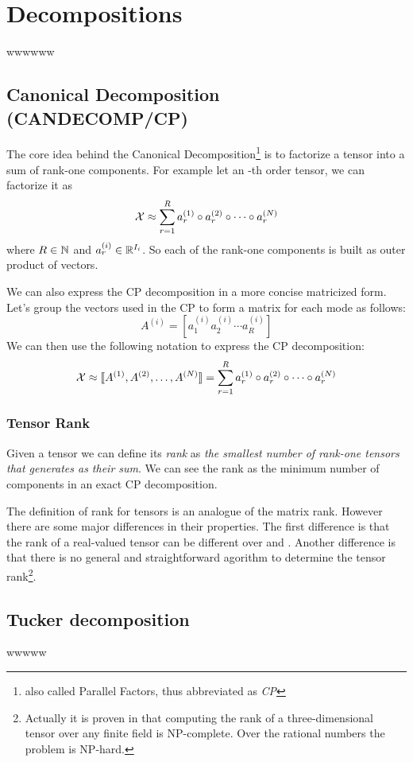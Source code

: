 \chapter{Decompositions}
wwwwww

\section{Canonical Decomposition (CANDECOMP/CP)}
The core idea behind the Canonical Decomposition\footnote{also called Parallel Factors, thus abbreviated as \emph{CP}} is to factorize a tensor into a sum of rank-one components. For example let \X an \N-th order tensor, we can factorize it as
\begin{equation}
  \mathcal{X} \approx \sum_{r = 1}^R a_r^{(1)} \circ a_r^{(2)} \circ \cdots \circ a_r^{(N)}
\end{equation}
where $R \in \mathbb{N}$ and $a_r^{(i)} \in \mathbb{R}^{I_i}$. So each of the rank-one components is built as outer product of \N vectors.

We can also express the CP decomposition in a more concise matricized form.
Let's group the vectors used in the CP to form a matrix for each mode  as follows:
\begin{equation*}
  A^{(i)} = [ a^{(i)}_1 a^{(i)}_2 \cdots a^{(i)}_R ]
\end{equation*}
We can then use the following notation to express the CP decomposition:
\begin{equation*}
  \mathcal{X} \approx \llbracket A^{(1)}, A^{(2)}, \ldots, A^{(N)} \rrbracket = \sum_{r = 1}^R a_r^{(1)} \circ a_r^{(2)} \circ \cdots \circ a_r^{(N)}
\end{equation*}


\subsection{Tensor Rank}
Given a tensor \X we can define its \emph{rank} as \emph{the smallest number of rank-one tensors that generates \X as their sum}. We can see the rank as the minimum number of components in an exact CP decomposition.

The definition of rank for tensors is an analogue of the matrix rank. However there are some major differences in their properties.
The first difference is that the rank of a real-valued tensor can be different over \RR and \CC {}. Another difference is that there is no general and straightforward agorithm to determine the tensor rank\footnote{Actually it is proven in \cite{rankNP} that computing the rank of a three-dimensional tensor over any finite field is NP-complete. Over the rational numbers the problem is NP-hard.}.

\section{Tucker decomposition}
wwwww
